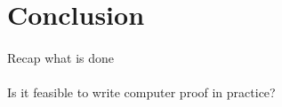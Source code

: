 \section{Conclusion}
\par 


\paragraph{} Recap what is done

\paragraph{} Is it feasible to write computer proof in practice? 